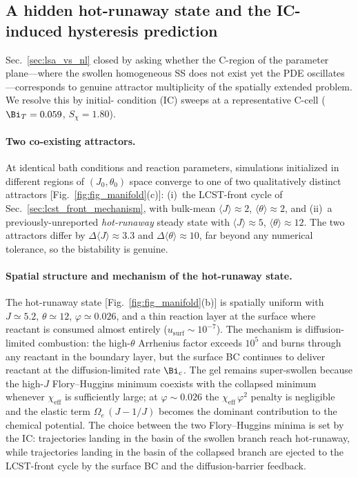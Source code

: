 \subsection{A hidden hot-runaway state and the IC-induced hysteresis
prediction}
\label{sec:multistability}

Sec.~\ref{sec:lsa_vs_nl} closed by asking whether the C-region of
the parameter plane—where the swollen homogeneous SS does not exist
yet the PDE oscillates—corresponds to genuine attractor multiplicity
of the spatially extended problem.  We resolve this by initial-
condition (IC) sweeps at a representative C-cell
($\Bi_T=0.059$, $S_\chi=1.80$).

\paragraph{Two co-existing attractors.}
At identical bath conditions and reaction parameters, simulations
initialized in different regions of $(J_0, \theta_0)$ space converge
to one of two qualitatively distinct attractors
[Fig.~\ref{fig:fig_manifold}(c)]: (i)~the LCST-front cycle of
Sec.~\ref{sec:lcst_front_mechanism}, with bulk-mean
$\langle J\rangle\!\approx\!2$,
$\langle\theta\rangle\!\approx\!2$, and (ii)~a previously-unreported
\emph{hot-runaway} steady state with
$\langle J\rangle\!\approx\!5$,
$\langle\theta\rangle\!\approx\!12$.
The two attractors differ by
$\Delta\langle J\rangle\!\approx\!3.3$ and
$\Delta\langle\theta\rangle\!\approx\!10$, far beyond any numerical
tolerance, so the bistability is genuine.

\paragraph{Spatial structure and mechanism of the hot-runaway state.}
The hot-runaway state [Fig.~\ref{fig:fig_manifold}(b)] is spatially
uniform with $J\!\simeq\!5.2$, $\theta\!\simeq\!12$,
$\varphi\!\simeq\!0.026$, and a thin reaction layer at the surface
where reactant is consumed almost entirely
($u_\mathrm{surf}\!\sim\!10^{-7}$).  The mechanism is diffusion-
limited combustion: the high-$\theta$ Arrhenius factor exceeds
$10^5$ and burns through any reactant in the boundary layer, but the
surface BC continues to deliver reactant at the diffusion-limited
rate $\Bi_c$.  The gel remains super-swollen because the high-$J$
Flory--Huggins minimum coexists with the collapsed minimum whenever
$\chi_\mathrm{eff}$ is sufficiently large; at $\varphi\!\sim\!0.026$
the $\chi_\mathrm{eff}\,\varphi^2$ penalty is negligible and the
elastic term $\Omega_e\,(J-1/J)$ becomes the dominant contribution to
the chemical potential.  The choice between the two
Flory--Huggins minima is set by the IC: trajectories landing in the
basin of the swollen branch reach hot-runaway, while trajectories
landing in the basin of the collapsed branch are ejected to the
LCST-front cycle by the surface BC and the diffusion-barrier
feedback.

